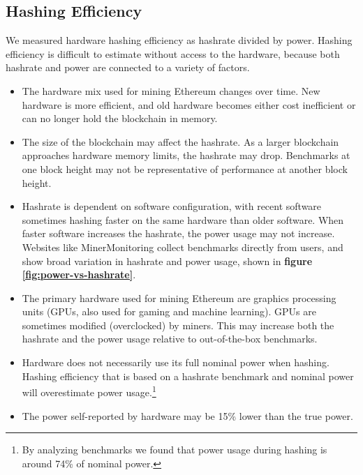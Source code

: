 \subsection{Hashing Efficiency}

We measured hardware hashing efficiency as hashrate divided by power. Hashing efficiency is difficult to estimate without access to the hardware, because both hashrate and power are connected to a variety of factors.

\begin{itemize}

    \item The hardware mix used for mining Ethereum changes over time. New hardware is more efficient, and old hardware becomes either cost inefficient or can no longer hold the blockchain in memory.\cite{minerstat_dag_2021}
    
    \item The size of the blockchain may affect the hashrate. As a larger blockchain approaches hardware memory limits, the hashrate may drop. Benchmarks at one block height may not be representative of performance at another block height.\cite{walton_ethereum_2017}
    
    \item Hashrate is dependent on software configuration, with recent software sometimes hashing faster on the same hardware than older software. When faster software increases the hashrate, the power usage may not increase. Websites like MinerMonitoring\cite{minermonitoring_gpu_2021} collect benchmarks directly from users, and show broad variation in hashrate and power usage, shown in \textbf{figure \ref{fig:power-vs-hashrate}}.
    
    \item The primary hardware used for mining Ethereum are graphics processing units (GPUs, also used for gaming and machine learning). GPUs are sometimes modified (overclocked) by miners. This may increase both the hashrate and the power usage relative to out-of-the-box benchmarks.

    \item Hardware does not necessarily use its full nominal power when hashing. Hashing efficiency that is based on a hashrate benchmark and nominal power will overestimate power usage.\footnote{By analyzing benchmarks we found that power usage during hashing is around 74\% of nominal power.}
    
    \item The power self-reported by hardware may be 15\% lower\cite{mad_electron_engineering_how_2021} than the true power.

\end{itemize}

